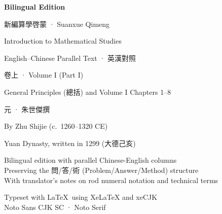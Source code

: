 \documentclass[10pt,a4paper]{article}
\begin{document}
\begin{titlepage}
\begin{center}
\vspace*{1.5cm}

{\fontsize{22}{28}\selectfont\color{titlecolor}
  \textbf{Bilingual Edition}}

\vspace{0.5cm}

{\fontsize{28}{36}\selectfont\color{titlecolor}
  新編算學啓蒙 · Suanxue Qimeng}

\vspace{0.5cm}

{\fontsize{16}{22}\selectfont\color{sectioncolor}
  Introduction to Mathematical Studies}

\vspace{0.3cm}

{\large\color{sectioncolor}
  English--Chinese Parallel Text · 英漢對照}

\vspace{1.5cm}

{\Large\color{titlecolor} 卷上 · Volume I (Part I)}

\vspace{0.3cm}

{\normalsize General Principles (總括) and Volume I Chapters 1--8}

\vspace{2cm}

{\large 元 · 朱世傑撰}

\vspace{0.2cm}

{\normalsize\color{sectioncolor}
  By Zhu Shijie (c.\ 1260--1320 CE)}

\vspace{0.2cm}

{\small\color{sectioncolor}
  Yuan Dynasty, written in 1299 (大德己亥)}

\vspace{2cm}

{\small\color{notecolor}
  Bilingual edition with parallel Chinese-English columns\\
  Preserving the 問/答/術 (Problem/Answer/Method) structure\\
  With translator's notes on rod numeral notation and technical terms
}

\vspace{0.5cm}

{\small\color{notecolor}
  Typeset with \LaTeX\ using XeLaTeX and xeCJK\\
  Noto Sans CJK SC · Noto Serif
}

\end{center}
\end{titlepage}
\end{document}
